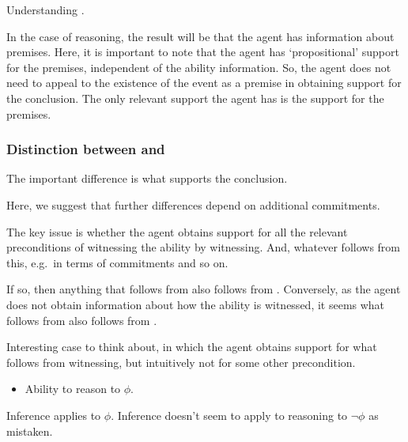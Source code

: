 \documentclass[10pt]{article}
\begin{document}
\begin{note}[Overview]
  Understanding \WR{}.
\end{note}

\begin{note}
  
\end{note}



\begin{note}
  In the case of reasoning, the result will be that the agent has information about premises.
  Here, it is important to note that the agent has `propositional' support for the premises, independent of the ability information.
  So, the agent does not need to appeal to the existence of the event as a premise in obtaining support for the conclusion.
  The only relevant support the agent has is the support for the premises.
\end{note}




\subsubsection{Distinction between \AR{} and \WR{}}
\label{sec:dist-betw-ar}

\begin{note}[Overview]
  The important difference is what supports the conclusion.

  Here, we suggest that further differences depend on additional commitments.
\end{note}


\begin{note}
  The key issue is whether the agent obtains support for all the relevant preconditions of witnessing the ability by witnessing.
  And, whatever follows from this, e.g.\ in terms of commitments and so on.

  If so, then anything that follows from \AR{} also follows from \WR{}.
  Conversely, as the agent does not obtain information about how the ability is witnessed, it seems what follows from \WR{} also follows from \AR{}.
\end{note}

\begin{note}
  Interesting case to think about, in which the agent obtains support for what follows from witnessing, but intuitively not for some other precondition.
  \begin{itemize}
  \item Ability to reason to \(\phi\).
  \end{itemize}
  Inference applies to \(\phi\).
  Inference doesn't seem to apply to reasoning to \(\lnot\phi\) as mistaken.
\end{note}
\end{document}
